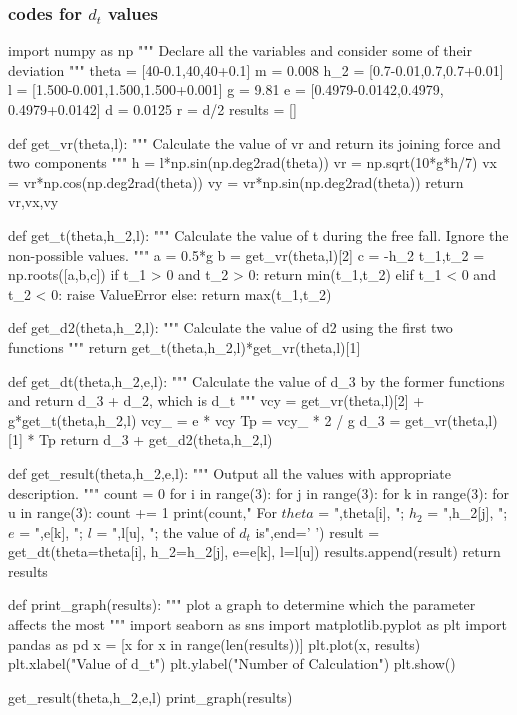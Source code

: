 \documentclass{article}
\begin{document}
    \subsubsection{codes for $d_t$ values}\label{ap:main_code}
    \begin{python}
import numpy as np
"""
Declare all the variables
and consider some of their
deviation
"""
theta = [40-0.1,40,40+0.1]
m = 0.008
h_2 = [0.7-0.01,0.7,0.7+0.01]
l = [1.500-0.001,1.500,1.500+0.001]
g = 9.81
e = [0.4979-0.0142,0.4979,
        0.4979+0.0142]
d = 0.0125
r = d/2
results = []

def get_vr(theta,l):
    """
    Calculate the value of vr and return
    its joining force and two components
    """
    h = l*np.sin(np.deg2rad(theta))
    vr = np.sqrt(10*g*h/7)
    vx = vr*np.cos(np.deg2rad(theta))
    vy = vr*np.sin(np.deg2rad(theta))
    return vr,vx,vy

def get_t(theta,h_2,l):
    """
    Calculate the value of t
    during the free fall.
    Ignore the non-possible values.
    """
    a = 0.5*g
    b = get_vr(theta,l)[2]
    c = -h_2
    t_1,t_2 = np.roots([a,b,c])
    if t_1 > 0 and t_2 > 0:
        return min(t_1,t_2)
    elif t_1 < 0 and t_2 < 0:
        raise ValueError
    else:
        return max(t_1,t_2)

def get_d2(theta,h_2,l):
    """
    Calculate the value of d2
    using the first two functions
    """
    return get_t(theta,h_2,l)*get_vr(theta,l)[1]

def get_dt(theta,h_2,e,l):
    """
    Calculate the value of d_3
    by the former functions and 
    return d_3 + d_2, which is 
    d_t
    """
    vcy = get_vr(theta,l)[2] + g*get_t(theta,h_2,l)
    vcy_ = e * vcy
    Tp = vcy_ * 2 / g
    d_3 = get_vr(theta,l)[1] * Tp
    return d_3 + get_d2(theta,h_2,l)

def get_result(theta,h_2,e,l):
    """
    Output all the values with
    appropriate description.
    """
    count = 0
    for i in range(3):
        for j in range(3):
            for k in range(3):
                for u in range(3):
                    count += 1
                    print(count," For $theta$ = ",theta[i],
                            "; $h_2$ = ",h_2[j],
                            "; $e$ = ",e[k],
                            "; $l$ = ",l[u],
                            "; the value of $d_t$ is",end=' ')
                    result = get_dt(theta=theta[i],
                                    h_2=h_2[j],
                                    e=e[k],
                                    l=l[u])
                    results.append(result)
    return results

def print_graph(results):
    """
    plot a graph to determine which
    the parameter affects the most
    """
    import seaborn as sns
    import matplotlib.pyplot as plt
    import pandas as pd
    x = [x for x in range(len(results))]
    plt.plot(x, results)
    plt.xlabel("Value of d_t")
    plt.ylabel("Number of Calculation")
    plt.show()

get_result(theta,h_2,e,l)
print_graph(results)

    \end{python}
\end{document}
